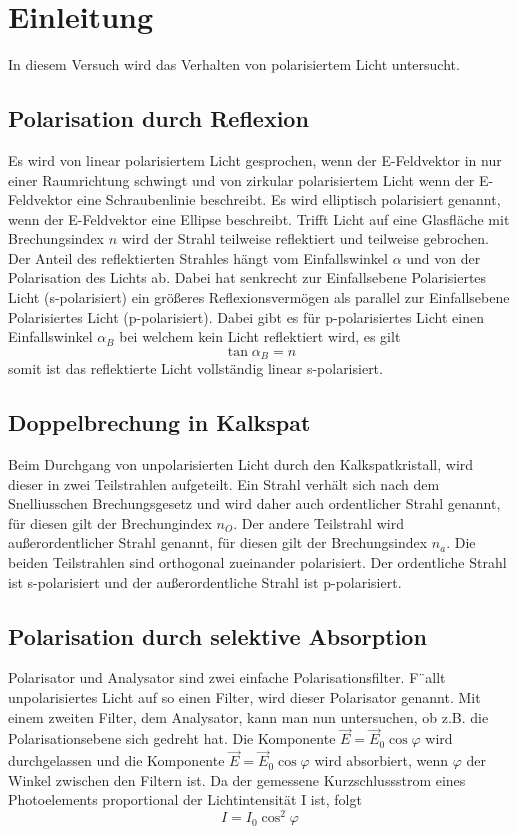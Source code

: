 \section{Einleitung}
In diesem Versuch wird das Verhalten von polarisiertem Licht untersucht.
\subsection{Polarisation durch Reflexion}
Es wird von linear polarisiertem Licht gesprochen, wenn der E-Feldvektor in nur einer Raumrichtung schwingt und von zirkular polarisiertem Licht wenn der E-Feldvektor eine Schraubenlinie beschreibt. Es wird elliptisch polarisiert genannt, wenn der E-Feldvektor eine Ellipse beschreibt.
Trifft Licht auf eine Glasfläche mit Brechungsindex $ n $ wird der Strahl teilweise reflektiert und teilweise gebrochen. Der Anteil des reflektierten Strahles hängt vom Einfallswinkel $ \alpha $ und von der Polarisation des Lichts ab.
Dabei hat senkrecht zur Einfallsebene Polarisiertes Licht (s-polarisiert) ein größeres Reflexionsvermögen als parallel zur Einfallsebene Polarisiertes Licht (p-polarisiert).
Dabei gibt es für p-polarisiertes Licht einen Einfallswinkel $ \alpha_{B} $ bei welchem kein Licht reflektiert wird, es gilt
\begin{equation}
\tan \alpha_{B} = n
\end{equation}
somit ist das reflektierte Licht vollständig linear s-polarisiert.
\subsection{Doppelbrechung in Kalkspat}
Beim Durchgang von unpolarisierten Licht durch den Kalkspatkristall, wird dieser in zwei Teilstrahlen aufgeteilt.
Ein Strahl verhält sich nach dem Snelliusschen Brechungsgesetz und wird daher auch ordentlicher Strahl genannt, für diesen gilt der Brechungindex $ n_{O} $. Der andere Teilstrahl wird außerordentlicher Strahl genannt, für diesen gilt der Brechungsindex $ n_{a} $. Die beiden Teilstrahlen sind orthogonal zueinander polarisiert. Der ordentliche Strahl ist s-polarisiert und der außerordentliche Strahl ist p-polarisiert.
\subsection{Polarisation durch selektive Absorption}
Polarisator und Analysator sind zwei einfache Polarisationsfilter. F¨allt unpolarisiertes
Licht auf so einen Filter, wird dieser Polarisator genannt. Mit einem
zweiten Filter, dem Analysator, kann man nun untersuchen, ob z.B. die Polarisationsebene
sich gedreht hat. Die Komponente $\vec E = \vec E_0 \cos\varphi$ wird durchgelassen und die Komponente $\vec E = \vec E_0 \cos\varphi$ wird absorbiert, wenn $\varphi$ der Winkel zwischen den Filtern ist. Da der gemessene Kurzschlussstrom eines Photoelements proportional der Lichtintensität I ist, folgt
\begin{equation}
I = I_0 \cos^2\varphi
\end{equation}
